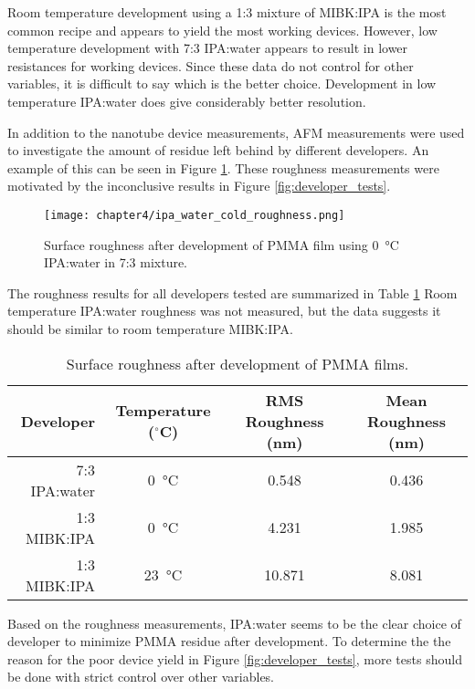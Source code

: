 Room temperature development using a 1:3 mixture of MIBK:IPA is the most common recipe and appears to yield the most working devices. However, low temperature development with 7:3 IPA:water appears to result in lower resistances for working devices. Since these data do not control for other variables, it is difficult to say which is the better choice. Development in low temperature IPA:water does give considerably better resolution. 

In addition to the nanotube device measurements, AFM measurements were used to investigate the amount of residue left behind by different developers. An example of this can be seen in Figure \ref{fig:roughness}. These roughness measurements were motivated by the inconclusive results in Figure \ref{fig:developer_tests}.

\begin{figure}
    \centering
    \texttt{[image: chapter4/ipa\_water\_cold\_roughness.png]}
    \caption{Surface roughness after development of PMMA film using \SI{0}{\celsius} IPA:water in 7:3 mixture.}
    \label{fig:roughness}
\end{figure}

The roughness results for all developers tested are summarized in Table \ref{table:surface_roughness} Room temperature IPA:water roughness was not measured, but the data suggests it should be similar to room temperature MIBK:IPA.

\begin{table}
    \centering
    \caption{Surface roughness after development of PMMA films.}
    \begin{tabular}{ r | c c c}
        Developer & Temperature ($^{\circ}$C) & RMS Roughness (nm) & Mean Roughness (nm) \\ \hline
    7:3 IPA:water & \SI{0}{\celsius} & 0.548 & 0.436 \\
    1:3 MIBK:IPA & \SI{0}{\celsius} & 4.231 & 1.985 \\
    1:3 MIBK:IPA & \SI{23}{\celsius} & 10.871 & 8.081 \\
    \end{tabular}
    \label{table:surface_roughness}  
\end{table}

Based on the roughness measurements, IPA:water seems to be the clear choice of developer to minimize PMMA residue after development. To determine the the reason for the poor device yield in Figure \ref{fig:developer_tests}, more tests should be done with strict control over other variables.

